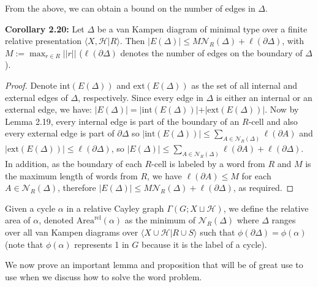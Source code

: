 \documentclass[12pt]{article}
\newcommand{\vs}{\vskip10pt}
\begin{document}
	From the above, we can obtain a bound on the number of edges in $\Delta$.
	
	\vs
	
	\textbf{Corollary 2.20: } Let $\Delta$ be a van Kampen diagram of minimal type over a finite relative presentation $\langle X, \mathcal{H} \vert R \rangle$. Then $\vert E(\Delta) \vert\leq M \mathcal{N}_R(\Delta) + \ell(\partial \Delta)$, with $M := \max_{r \in R} \vert \vert r \vert \vert$ ($\ell(\partial \Delta)$ denotes the number of edges on the boundary of $\Delta$).
	
	\begin{proof}
		
		Denote $\text{int}(E(\Delta))$ and $\text{ext}(E(\Delta))$ as the set of all internal and external edges of $\Delta$, respectively. Since every edge in $\Delta$ is either an internal or an external edge, we have: $\vert E(\Delta) \vert = \vert \text{int}(E(\Delta)) \vert + \vert \text{ext}(E(\Delta)) \vert$. Now by Lemma 2.19, every internal edge is part of the boundary of an $R$-cell and also every external edge is part of $\partial \Delta$ so $\vert \text{int}(E(\Delta)) \vert \leq \sum_{A \in \mathcal{N}_R(\Delta)} \ell(\partial A)$ and $\vert \text{ext}(E(\Delta)) \vert \leq \ell(\partial \Delta)$, so $\vert E(\Delta) \vert \leq \sum_{A \in \mathcal{N}_R(\Delta)} \ell(\partial A) + \ell(\partial \Delta)$. In addition, as the boundary of each $R$-cell is labeled by a word from $R$ and $M$ is the maximum length of words from $R$, we have $\ell(\partial A) \leq M$ for each $A \in \mathcal{N}_R(\Delta)$, therefore $\vert E(\Delta) \vert \leq M \mathcal{N}_R(\Delta) + \ell(\partial \Delta)$, as required. 
		
	\end{proof}
	
	\vs
	
	Given a cycle $\alpha$ in a relative Cayley graph $\Gamma(G; X \sqcup \mathcal{H})$, we define the relative area of $\alpha$, denoted $\text{Area}^{\text{rel}} (\alpha)$ as the minimum of $\mathcal{N}_R(\Delta)$ where $\Delta$ ranges over all van Kampen diagrams over $\langle X \cup \mathcal{H} \vert R \cup S \rangle$ such that $\phi(\partial \Delta) = \phi(\alpha)$ (note that $\phi(\alpha)$ represents 1 in $G$ because it is the label of a cycle).  
	
	\vs 
	
	We now prove an important lemma and proposition that will be of great use to use when we discuss how to solve the word problem. 
	
\end{document}

